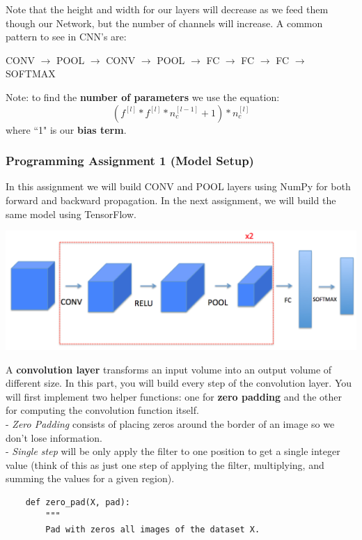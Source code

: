 \documentclass[11pt, a4paper]{article}
\begin{document}
\begin{spacing}{1.1}
\begin{center}
	\end{center}
	Note that the height and width for our layers will decrease as we feed them though our Network, but the number of channels will increase. A common pattern to see in CNN's are:
	\begin{center}
	CONV $\rightarrow$ POOL $\rightarrow$ CONV $\rightarrow$ POOL $\rightarrow$ FC $\rightarrow$ FC $\rightarrow$ FC $\rightarrow$ SOFTMAX
	\end{center}
	Note: to find the \textbf{number of parameters} we use the equation: $$ (f^{[l]} * f^{[l]} * n_c^{[l-1]} + 1) * n_c^{[l]} $$ where ``1" is our \textbf{bias term}. \newpage

	\subsubsection{Programming Assignment 1 (Model Setup)}
	In this assignment we will build CONV and POOL layers using NumPy for both forward and backward propagation. In the next assignment, we will build the same model using TensorFlow.
	\begin{center}	\includegraphics[scale=.5]{pa1}	\end{center}
	A \textbf{convolution layer} transforms an input volume into an output volume of different size. In this part, you will build every step of the convolution layer. You will first implement two helper functions: one for \textbf{zero padding} and the other for computing the convolution function itself. \\
	- \textit{Zero Padding} consists of placing zeros around the border of an image so we don't lose information. \\
	- \textit{Single step} will be only apply the filter to one position to get a single integer value (think of this as \hspace*{2mm} just one step of applying the filter, multiplying, and summing the values for a given region).
	\begin{lstlisting}
	def zero_pad(X, pad):
		"""
		Pad with zeros all images of the dataset X.
		

\end{lstlisting}
\end{spacing}
\end{document}
